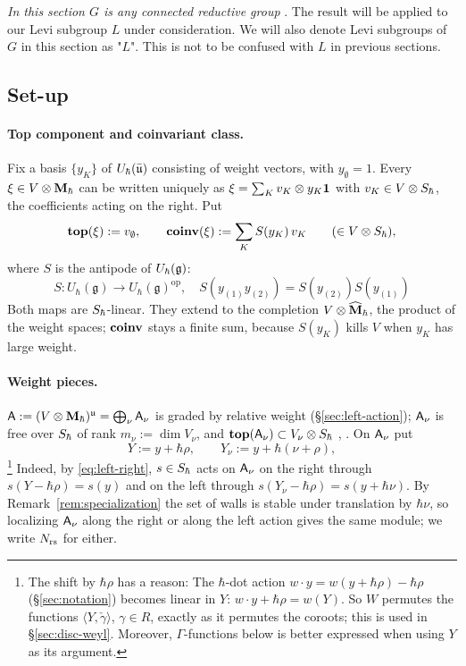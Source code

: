 \documentclass{article}
\theoremstyle{plain}
\theoremstyle{definition}
\theoremstyle{remark}
\numberwithin{equation}{section}
\begin{document}
\emph{In this section $G$ is any connected reductive group} . The result will be applied to our Levi subgroup $L$ under consideration. We will also denote Levi subgroups of $G$ in this section as "$L$". This is not to be confused with $L$ in previous sections.

\subsection{Set-up}\label{sec:disc-setup}

\paragraph{Top component and coinvariant class.}
Fix a basis $\{y_K\}$ of $U_\hbar(\bar{\mathfrak u})$ consisting of weight vectors, with $y_\emptyset=1$. Every $\xi\in V\otimes\mathbf{M}_\hbar$ can be written uniquely as $\xi=\sum_Kv_K\otimes y_K\mathbf 1$ with $v_K\in V\otimes S_\hbar$, the coefficients acting on the right. Put
\[
\operatorname{\mathbf{top}}(\xi):=v_\emptyset,\qquad\operatorname{\mathbf{coinv}}(\xi):=\sum_KS(y_K)\,v_K\qquad(\in V\otimes S_\hbar),
\]
where $S$ is the antipode of $U_\hbar(\mathfrak{g})$:
\begin{equation*}
    S: U_\hbar(\mathfrak g) \to U_\hbar (\mathfrak g)^{\operatorname{op}}, \quad S(y_{(1)}y_{(2)}) = S(y_{(2)})S(y_{(1)})
\end{equation*}
Both maps are $S_\hbar$-linear. They extend to the completion $V\otimes\widehat{\mathbf M}_\hbar$, the product of the weight spaces; $\operatorname{\mathbf{coinv}}$ stays a finite sum, because $S(y_K)$ kills $V$ when $y_K$ has large weight.

\paragraph{Weight pieces.}
$\mathsf A:=(V\otimes\mathbf{M}_\hbar)^{\mathfrak{u}}=\bigoplus_\nu\mathsf A_\nu$ is graded by relative weight (\S\ref{sec:left-action}); $\mathsf A_\nu$ is free over $S_\hbar$ of rank $m_\nu:=\dim V_\nu$, and $\operatorname{\mathbf{top}}(\mathsf A_\nu)\subset V_\nu\otimes S_\hbar$ \cite{ginzburg2014differentialoperatorsguaffine}, \cite[Lemma 7.3.3]{ginzburg2022differentialoperatorsgugelfandgraev}. On $\mathsf A_\nu$ put
\[
Y:=y+\hbar\rho,\qquad Y_\nu:=y+\hbar(\nu+\rho),
\]
\footnote{The shift by $\hbar\rho$ has a reason: The $\hbar$-dot action $w\cdot y=w(y+\hbar\rho)-\hbar\rho$ (\S\ref{sec:notation}) becomes linear in $Y$: $w\cdot y+\hbar\rho=w(Y)$. So $W$ permutes the functions $\langle Y,\check\gamma\rangle$, $\gamma\in R$, exactly as it permutes the coroots; this is used in \S\ref{sec:disc-weyl}. Moreover, $\Gamma$-functions below is better expressed when using $Y$ as its argument.} Indeed, by \eqref{eq:left-right}, $s\in S_\hbar$ acts on $\mathsf A_\nu$ on the right through $s(Y-\hbar\rho)=s(y)$ and on the left through $s(Y_\nu-\hbar\rho)=s(y+\hbar\nu)$. By Remark~\ref{rem:specialization} the set of walls is stable under translation by $\hbar\nu$, so localizing $\mathsf A_\nu$ along the right or along the left action gives the same module; we write $N_{\mathrm{rs}}$ for either.
\end{document}

